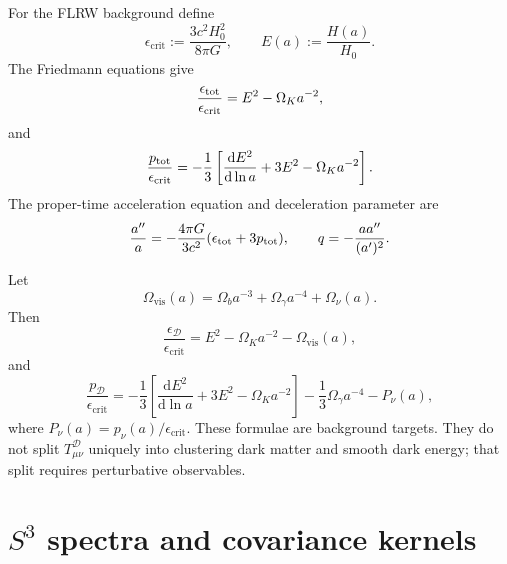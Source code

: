 \documentclass[
  aps,
  prd,
  reprint,
  superscriptaddress,
  nofootinbib,
  floatfix,
  longbibliography
]{revtex4-2}
\newcommand{\D}{\mathcal D}
\newcommand{\vis}{\mathrm{vis}}
\newcommand{\crit}{\mathrm{crit}}
\newcommand{\dd}{\mathrm d}
\begin{document}
For the FLRW background define
\begin{equation}
  \epsilon_{\crit}:=\frac{3c^2H_0^2}{8\pi G},
  \qquad
  E(a):=\frac{H(a)}{H_0}.
\end{equation}
The Friedmann equations give
\begin{equation}
  \frac{\epsilon_{\rm tot}}{\epsilon_{\crit}}
  =
  E^2-\Omega_Ka^{-2},
  \label{eq:eps_total}
\end{equation}
and
\begin{equation}
  \frac{p_{\rm tot}}{\epsilon_{\crit}}
  =
  -\frac13
  \left[
  \frac{\dd E^2}{\dd\ln a}
  +3E^2-\Omega_Ka^{-2}
  \right].
  \label{eq:p_total}
\end{equation}
The proper-time acceleration equation and deceleration parameter are
\begin{equation}
  \frac{a''}{a}
  =
  -\frac{4\pi G}{3c^2}(\epsilon_{\rm tot}+3p_{\rm tot}),
  \qquad
  q=-\frac{aa''}{(a')^2}.
  \label{eq:acceleration_q}
\end{equation}

Let
\begin{equation}
  \Omega_{\vis}(a)=
  \Omega_ba^{-3}+\Omega_\gamma a^{-4}+\Omega_\nu(a).
\end{equation}
Then
\begin{equation}
  \frac{\epsilon_\D}{\epsilon_{\crit}}
  =
  E^2-\Omega_Ka^{-2}-\Omega_{\vis}(a),
  \label{eq:epsD}
\end{equation}
and
\begin{equation}
  \frac{p_\D}{\epsilon_{\crit}}
  =
  -\frac13
  \left[
  \frac{\dd E^2}{\dd\ln a}
  +3E^2-\Omega_Ka^{-2}
  \right]
  -\frac13\Omega_\gamma a^{-4}
  -P_\nu(a),
  \label{eq:pD}
\end{equation}
where \(P_\nu(a)=p_\nu(a)/\epsilon_{\crit}\).  These formulae are
background targets.  They do not split \(T^\D_{\mu\nu}\) uniquely into
clustering dark matter and smooth dark energy; that split requires
perturbative observables.

\section{\texorpdfstring{\(S^3\)}{S3} spectra and covariance kernels}
\label{sec:spectra}
\end{document}
